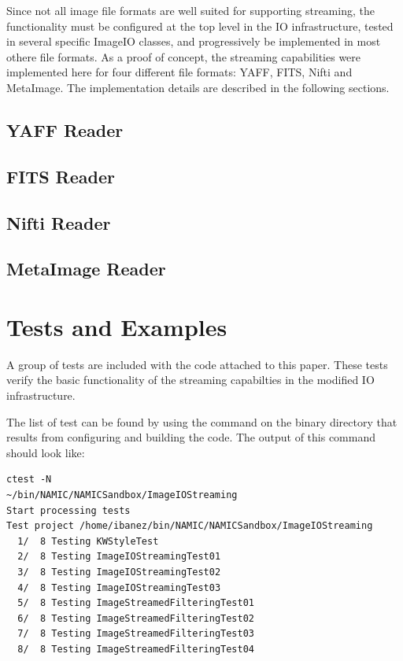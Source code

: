 \documentclass{InsightArticle}
\begin{document}
Since not all image file formats are well suited for supporting streaming, the
functionality must be configured at the top level in the IO infrastructure,
tested in several specific ImageIO classes, and progressively be implemented in
most othere file formats. As a proof of concept, the streaming capabilities
were implemented here for four different file formats: YAFF, FITS, Nifti and
MetaImage. The implementation details are described in the following sections.

\subsection{YAFF Reader}
\subsection{FITS Reader}
\subsection{Nifti Reader}
\subsection{MetaImage Reader}

\section{Tests and Examples}

A group of tests are included with the code attached to this paper. These tests
verify the basic functionality of the streaming capabilties in the modified IO
infrastructure.

The list of test can be found by using the  command on the binary
directory that results from configuring and building the code. The output of this
command should look like:

\begin{verbatim}
ctest -N                                                                                                                          ~/bin/NAMIC/NAMICSandbox/ImageIOStreaming
Start processing tests
Test project /home/ibanez/bin/NAMIC/NAMICSandbox/ImageIOStreaming
  1/  8 Testing KWStyleTest
  2/  8 Testing ImageIOStreamingTest01
  3/  8 Testing ImageIOStreamingTest02
  4/  8 Testing ImageIOStreamingTest03
  5/  8 Testing ImageStreamedFilteringTest01
  6/  8 Testing ImageStreamedFilteringTest02
  7/  8 Testing ImageStreamedFilteringTest03
  8/  8 Testing ImageStreamedFilteringTest04
\end{verbatim}
\end{document}
